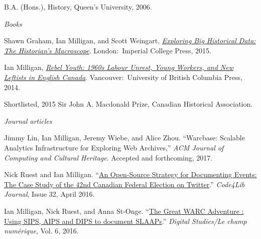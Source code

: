 \documentclass[11pt,article,oneside]{memoir}
\begin{document}
\ind B.A. (Hons.), History, Queen's University, 2006.

\bigskip
 
\medskip
\noindent\emph{Books \vspace{0.01in}}

\ind  Shawn Graham, Ian Milligan, and Scott Weingart, \emph{\href{http://www.worldscientific.com/worldscibooks/10.1142/p981}{Exploring Big Historical Data: The Historian's Macroscope}}. London:~Imperial College Press, 2015. \vspace{0.05in}

\ind  Ian Milligan, \emph{\href{http://www.ubcpress.ca/search/title_book.asp?BookID=299174315}{Rebel Youth: 1960s Labour Unrest, Young Workers, and New Leftists in English Canada}}. Vancouver:~University of British Columbia Press, 2014.\vspace{0.05in}

\ind \hspace{0.35in} \footnotesize Shortlisted, 2015 Sir John A. Macdonald Prize, Canadian Historical Association.

\vspace{-0.075in}

\normalsize

\bigskip
\noindent\emph{Journal articles \vspace{0.05in}}
 

\ind Jimmy Lin, Ian Milligan, Jeremy Wiebe, and Alice Zhou. ``Warcbase: Scalable Analytics Infrastructure for Exploring Web Archives,'' \emph{ACM Journal of Computing and Cultural Heritage}. Accepted and forthcoming, 2017.

\ind Nick Ruest and Ian Milligan. ``\href{http://journal.code4lib.org/articles/11358}{An Open-Source Strategy for Documenting Events: The Case Study of the 42nd Canadian Federal Election on Twitter}.'' \emph{Code4Lib Journal}, Issue 32, April 2016.

\ind Ian Milligan, Nick Ruest, and Anna St-Onge. ``\href{http://www.digitalstudies.org/ojs/index.php/digital_studies/article/view/325/412}{The Great WARC Adventure : Using SIPS, AIPS and DIPS to document SLAAPs}.'' \emph{Digital Studies/Le champ num\'erique}, Vol. 6, 2016.
\end{document}
